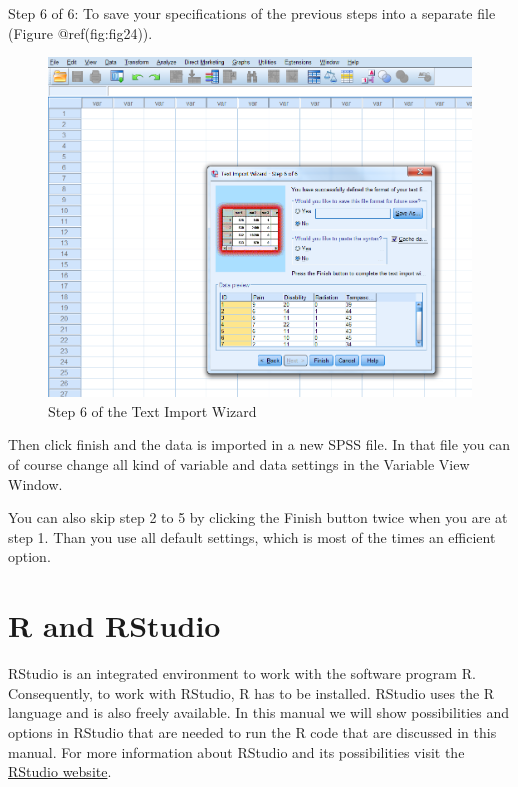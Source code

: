 \documentclass[
]{book}
\begin{document}
Step 6 of 6: To save your specifications of the previous steps into a
separate file (Figure @ref(fig:fig24)).

\begin{figure}

{\centering \includegraphics[width=0.95\linewidth]{images/fig1.24} 

}

\caption{Step 6 of the Text Import Wizard}\label{fig:fig24}
\end{figure}

Then click finish and the data is imported in a new SPSS file. In that
file you can of course change all kind of variable and data settings in
the Variable View Window.

You can also skip step 2 to 5 by clicking the Finish button twice when
you are at step 1. Than you use all default settings, which is most of
the times an efficient option.

\hypertarget{r-and-rstudio}{%
\section{R and RStudio}\label{r-and-rstudio}}

RStudio is an integrated environment to work with the software program
R. Consequently, to work with RStudio, R has to be installed. RStudio
uses the R language and is also freely available. In this manual we will
show possibilities and options in RStudio that are needed to run the R
code that are discussed in this manual. For more information about
RStudio and its possibilities visit the
\href{https://www.rstudio.com/}{RStudio website}.
\end{document}
